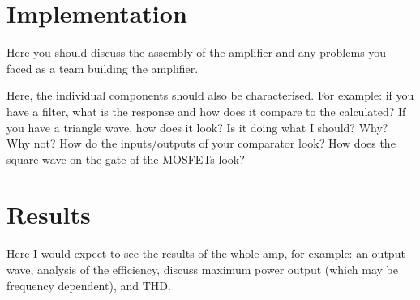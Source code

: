 \documentclass[a4paper,11pt]{article}
\begin{document}
\section{Implementation}

Here you should discuss the assembly of the amplifier and any problems you faced as a team building the amplifier.

Here, the individual components should also be characterised. For example: if you have a filter, what is the response and how does it compare to the calculated? If you have a triangle wave, how does it look? Is it doing what I should? Why? Why not? How do the inputs/outputs of your comparator look? How does the square wave on the gate of the MOSFETs look?

\section{Results}

Here I would expect to see the results of the whole amp, for example: an output wave, analysis of the efficiency, discuss maximum power output (which may be frequency dependent), and THD.
\end{document}
